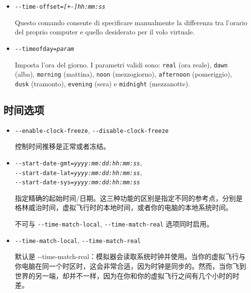 {\begin{itemize}
  \item{\texttt{-$ $-time-offset={\it [+-]hh:mm:ss}}}

  Questo comando consente di specificare manualmente la differenza tra
  l'orario del proprio computer e quello desiderato per il volo virtuale.

  \item{\texttt{-$ $-timeofday={\it param}}}

  Imposta l'ora del giorno. I parametri validi sono: \texttt{real} (ora reale),
  \texttt{dawn} (alba), \texttt{morning} (mattina),
  \texttt{noon} (mezzogiorno), \texttt{afternoon} (pomeriggio),
  \texttt{dusk} (tramonto), \texttt{evening} (sera) e \texttt{midnight} (mezzanotte).

  \end{itemize}
}
\ifchinese
{
  \subsection{时间选项}
\begin{itemize}

  \item{\texttt{-$ $-enable-clock-freeze}, \texttt{-$ $-disable-clock-freeze}}

   控制时间推移是正常或者冻结。
 
\item{\texttt{-$ $-start-date-gmt={\it yyyy:mm:dd:hh:mm:ss}},\\
  \texttt{-$ $-start-date-lat={\it yyyy:mm:dd:hh:mm:ss}},\\
  \texttt{-$ $-start-date-sys={\it yyyy:mm:dd:hh:mm:ss}}}

  指定精确的起始时间/日期。这三种功能的区别是指定不同的参考点，分别是格林威治时间，虚拟飞行时的本地时间，或者你的电脑的本地系统时间。

  不可与 \texttt{-$ $-time-match-local}, \texttt{-$ $-time-match-real} 选项同时启用。

\item{\texttt{-$ $-time-match-local}, \texttt{-$ $-time-match-real}}

  默认是 {-$ $-time-match-real}：模拟器会读取系统时钟并使用。当你的虚拟飞行与你电脑在同一个时区时，这会非常合适，因为时钟是同步的。然而，当你飞到世界的另一端，却并不一样，因为在你和你的虚拟飞行之间有几个小时的时差。


\end{itemize}}
